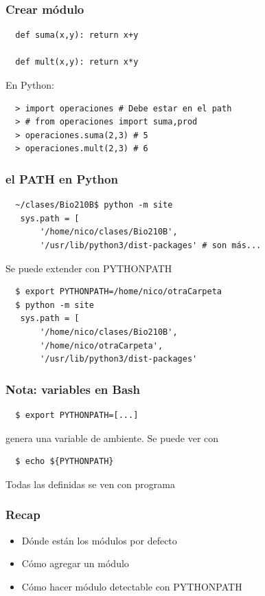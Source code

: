 \documentclass[14pt,aspectratio=169,xcolor=dvipsnames]{beamer}
\begin{document}
\begin{frame}[fragile]\frametitle{Crear módulo}
    \begin{verbatim}
  def suma(x,y): return x+y

  def mult(x,y): return x*y
    \end{verbatim}

  En Python:
  \begin{verbatim}
  > import operaciones # Debe estar en el path
  > # from operaciones import suma,prod
  > operaciones.suma(2,3) # 5
  > operaciones.mult(2,3) # 6
  \end{verbatim}
\end{frame}
\begin{frame}[fragile]\frametitle{el PATH en Python}
    \begin{verbatim}
  ~/clases/Bio210B$ python -m site
   sys.path = [
       '/home/nico/clases/Bio210B',
       '/usr/lib/python3/dist-packages' # son más...
    \end{verbatim}

    \pause Se puede extender con PYTHONPATH
    \begin{verbatim}
  $ export PYTHONPATH=/home/nico/otraCarpeta
  $ python -m site
   sys.path = [
       '/home/nico/clases/Bio210B',
       '/home/nico/otraCarpeta',
       '/usr/lib/python3/dist-packages'
    \end{verbatim}

\end{frame}
\begin{frame}[fragile]\frametitle{Nota: variables en Bash}
    \begin{verbatim}
  $ export PYTHONPATH=[...]
    \end{verbatim}
    genera una variable de ambiente. Se puede ver con
    \begin{verbatim}
  $ echo ${PYTHONPATH}
    \end{verbatim}
  Todas las definidas se ven con programa 
\end{frame}
\begin{frame}\frametitle{Recap}
    \begin{itemize}
        \item Dónde están los módulos por defecto
        \item Cómo agregar un módulo
        \item Cómo hacer módulo detectable con PYTHONPATH
    \end{itemize}
\end{frame}
\end{document}
